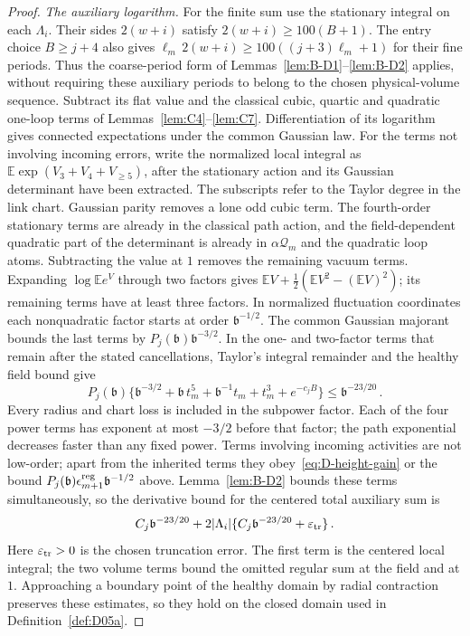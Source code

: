 \begin{proof}
\emph{The auxiliary logarithm.} For the finite sum use the stationary integral on each $\Lambda_i$. Their sides $2(w+i)$ satisfy $2(w+i)\ge100(B+1)$. The entry choice $B\ge j+4$ also gives $\ell_m\,2(w+i)\ge100((j+3)\ell_m+1)$ for their fine periods. Thus the coarse-period form of Lemmas~\ref{lem:B-D1}--\ref{lem:B-D2} applies, without requiring these auxiliary periods to belong to the chosen physical-volume sequence. Subtract its flat value and the classical cubic, quartic and quadratic one-loop terms of Lemmas~\ref{lem:C4}--\ref{lem:C7}. Differentiation of its logarithm gives connected expectations under the common Gaussian law. For the terms not involving incoming errors, write the normalized local integral as $\mathbb E\exp(V_3+V_4+V_{\ge5})$, after the stationary action and its Gaussian determinant have been extracted. The subscripts refer to the Taylor degree in the link chart. Gaussian parity removes a lone odd cubic term. The fourth-order stationary terms are already in the classical path action, and the field-dependent quadratic part of the determinant is already in $\alpha\mathcal Q_m$ and the quadratic loop atoms. Subtracting the value at $1$ removes the remaining vacuum terms. Expanding $\log\mathbb E e^V$ through two factors gives $\mathbb EV+\frac12(\mathbb EV^2-(\mathbb EV)^2)$; its remaining terms have at least three factors. In normalized fluctuation coordinates each nonquadratic factor starts at order $\mathfrak b^{-1/2}$. The common Gaussian majorant bounds the last terms by $P_j(\mathfrak b)\mathfrak b^{-3/2}$. In the one- and two-factor terms that remain after the stated cancellations, Taylor's integral remainder and the healthy field bound give
\begin{equation*}
P_j(\mathfrak b)\{\mathfrak b^{-3/2}+\mathfrak b\,t_m^5+\mathfrak b^{-1}t_m+t_m^3+e^{-c_jB}\}
\le \mathfrak b^{-23/20}\,.
\end{equation*}
Every radius and chart loss is included in the subpower factor. Each of the four power terms has exponent at most $-3/2$ before that factor; the path exponential decreases faster than any fixed power. Terms involving incoming activities are not low-order; apart from the inherited terms they obey~\eqref{eq:D-height-gain} or the bound $P_j(\mathfrak b)\epsilon_{m+1}^{\rm reg}\mathfrak b^{-1/2}$ above. Lemma~\ref{lem:B-D2} bounds these terms simultaneously, so the derivative bound for the centered total auxiliary sum is
\begin{equation}\label{eq:D-aux-bound}
C_j \mathfrak b^{-23/20}+2|\Lambda_i|\{C_j \mathfrak b^{-23/20}+\varepsilon_{\rm tr}\}\,.
\end{equation}
Here $\varepsilon_{\rm tr}>0$ is the chosen truncation error. The first term is the centered local integral; the two volume terms bound the omitted regular sum at the field and at $1$. Approaching a boundary point of the healthy domain by radial contraction preserves these estimates, so they hold on the closed domain used in Definition~\ref{def:D05a}.


\end{proof}
